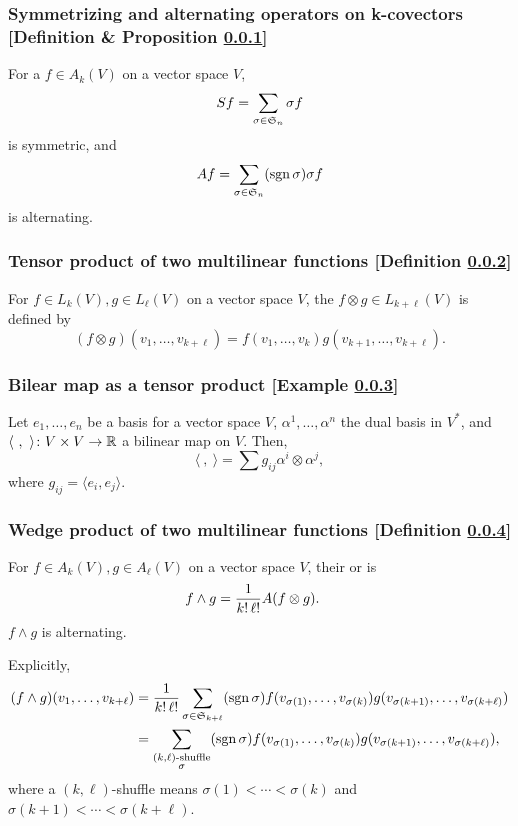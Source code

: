 \subsubsection{Symmetrizing and alternating operators on k-covectors [Definition \& Proposition \ref{symmetrizing-and-alternating-operators-on-k-covectors}]}\label{symmetrizing-and-alternating-operators-on-k-covectors}
For a $f \in A_k(V)$ on a vector space $V$,
\[
 Sf = \sum_{\sigma \in \mathfrak{S}_n} \sigma f
\]
is symmetric, and
\[
 Af = \sum_{\sigma \in \mathfrak{S}_n} (\operatorname{sgn} \sigma) \sigma f
\]
is alternating.

\subsubsection{Tensor product of two multilinear functions [Definition \ref{tensor-product-of-two-multilinear-functions}]}\label{tensor-product-of-two-multilinear-functions}
For $f \in L_k(V), g \in L_\ell(V)$ on a vector space $V$, the  $f \otimes g \in L_{k+\ell}(V)$ is defined by
\[
(f \otimes g) (v_1, \dotsc, v_{k+\ell}) = f(v_1,\dotsc,v_k)g(v_{k+1},\dotsc,v_{k+\ell}).
\]

\subsubsection{Bilear map as a tensor product [Example \ref{bilinear-map-as-a-tensor-product}]}\label{bilinear-map-as-a-tensor-product}
Let $e_1,\dotsc,e_n$ be a basis for a vector space $V$, $\alpha^1,\dotsc,\alpha^n$ the dual basis in $V^*$, and $\langle\ ,\ \rangle \colon V \times V \to \mathbb{R}$ a bilinear map on $V$. Then,
\[
\langle\ , \ \rangle = \sum g_{ij} \alpha^i \otimes \alpha^j,
\]
where $g_{ij} = \langle e_i, e_j \rangle$.

\subsubsection{Wedge product of two multilinear functions [Definition \ref{wedge-product-of-two-multilinear-functions}]}\label{wedge-product-of-two-multilinear-functions}
For $f \in A_k(V), g \in A_\ell(V)$ on a vector space $V$, their  or  is
\begin{align*}
f \wedge g &= \frac1{k!\, \ell!} A( f \otimes g).
\end{align*}
$f \wedge g$ is alternating.

Explicitly,
\begin{align*}
(f \wedge g) (v_1,\dotsc,v_{k+\ell}) &= \frac1{k!\,\ell!} \sum_{\sigma \in \mathfrak{S}_{k+\ell}} (\operatorname{sgn} \sigma)f(v_{\sigma(1)},\dotsc,v_{\sigma(k)}) g(v_{\sigma(k+1)},\dotsc,v_{\sigma(k+\ell)}) \\
&= \sum_{\substack{(k,\ell)\text{-shuffle}\\ \sigma}} (\operatorname{sgn} \sigma) f(v_{\sigma(1)},\dotsc,v_{\sigma(k)}) g(v_{\sigma(k+1)},\dotsc,v_{\sigma(k+\ell)}),
\end{align*}
where a $(k,\ell)$-shuffle means $\sigma(1)<\dotsb<\sigma(k)$ and $\sigma(k+1)<\dotsb < \sigma(k+\ell)$.

